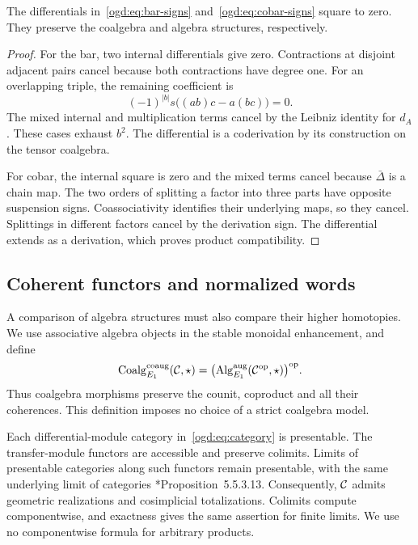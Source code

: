 \begin{lemma}\label{ogd:lem:squares}
The differentials in~\eqref{ogd:eq:bar-signs} and~\eqref{ogd:eq:cobar-signs} square to zero.
They preserve the coalgebra and algebra structures, respectively.
\end{lemma}
\begin{proof}
For the bar, two internal differentials give zero.
Contractions at disjoint adjacent pairs cancel because both contractions have degree one.
For an overlapping triple, the remaining coefficient is
\[
 (-1)^{|b|}s\bigl((ab)c-a(bc)\bigr)=0.
\]
The mixed internal and multiplication terms cancel by the Leibniz identity for \(d_A\).
These cases exhaust \(b^2\).
The differential is a coderivation by its construction on the tensor coalgebra.

For cobar, the internal square is zero and the mixed terms cancel because \(\bar\Delta\) is a chain map.
The two orders of splitting a factor into three parts have opposite suspension signs.
Coassociativity identifies their underlying maps, so they cancel.
Splittings in different factors cancel by the derivation sign.
The differential extends as a derivation, which proves product compatibility.
\end{proof}

\subsection{Coherent functors and normalized words}
\label{ogd:sec:enhanced-bar}

A\label{ogd:def:coherent-coalgebra-category} comparison of algebra structures must also compare their higher homotopies.
We use associative algebra objects in the stable monoidal enhancement, and define
\[
 \operatorname{Coalg}_{E_1}^{\mathrm{coaug}}(\mathcal C,\star)
 =\bigl(\operatorname{Alg}_{E_1}^{\mathrm{aug}}
       (\mathcal C^{\mathrm{op}},\star)\bigr)^{\mathrm{op}}.
\]
Thus coalgebra morphisms preserve the counit, coproduct and all their coherences.
This definition imposes no choice of a strict coalgebra model.

Each differential-module category in~\eqref{ogd:eq:category} is presentable.
The transfer-module functors are accessible and preserve colimits.
Limits of presentable categories along such functors remain presentable, with the same underlying limit of categories
\cite{wdesc:lurie-htt}*{Proposition~5.5.3.13}.
Consequently, $\mathcal C$ admits geometric realizations and cosimplicial totalizations.
Colimits compute componentwise, and exactness gives the same assertion for finite limits.
We use no componentwise formula for arbitrary products.

